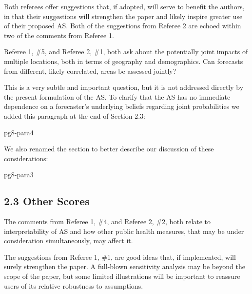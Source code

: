 \documentclass{article}
\begin{document}
\begin{quotebar}
Both referees offer suggestions that, if adopted, will serve to benefit
the authors, in that their suggestions will strengthen the paper and
likely inspire greater use of their proposed AS.  Both of the suggestions
from Referee 2 are echoed within two of the comments from Referee 1.

Referee 1, \#5, and Referee 2, \#1, both ask about the potentially
joint impacts of multiple locations, both in terms of geography
and demographics.  Can forecasts from different, likely correlated,
areas be assessed jointly?
\end{quotebar}

This is a very subtle and important question, but it is not addressed
directly by the present formulation of the AS. To clarify
that the AS has no immediate dependence on a forecaster's underlying beliefs regarding
joint probabilities we added this paragraph at the end of Section 2.3:

\begin{mybox}{pg8-para4}
\DIFaddbegin {}
\DIFaddend 
\end{mybox}

We also renamed the section to better describe our discussion of these considerations:

\begin{mybox}{pg8-para3}
  \DIFaddend \subsection*{2.3 \quad \DIFdelbegin {}\DIFdelend \DIFaddbegin {}\DIFaddend Other Scores}
\end{mybox}

\begin{quotebar}
The comments from Referee 1, \#4, and Referee 2, \#2, both relate to
interpretability of AS and how other public health measures, that may
be under consideration simultaneously, may affect it.
 
The suggestions from Referee 1, \#1, are good ideas that, if implemented,
will surely strengthen the paper. A full-blown sensitivity analysis may
be beyond the scope of the paper, but some limited illustrations will
be important to reassure users of its relative robustness to assumptions.  
\end{quotebar}
\end{document}
